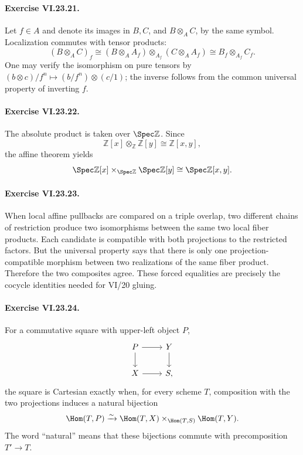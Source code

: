 \paragraph{Exercise VI.23.21.}
\begin{solution}
Let $f\in A$ and denote its images in $B,C$, and $B\otimes_AC$, by the same symbol.  Localization
commutes with tensor products:
\[
(B\otimes_AC)_f
\cong (B\otimes_AA_f)\otimes_{A_f}(C\otimes_AA_f)
\cong B_f\otimes_{A_f}C_f.
\]
One may verify the isomorphism on pure tensors by
$(b\otimes c)/f^n\mapsto (b/f^n)\otimes(c/1)$; the inverse follows from the common universal
property of inverting $f$.
\end{solution}

\paragraph{Exercise VI.23.22.}
\begin{solution}
The absolute product is taken over $\Spec\mathbb Z$.  Since
\[
\mathbb Z[x]\otimes_{\mathbb Z}\mathbb Z[y]
\cong\mathbb Z[x,y],
\]
the affine theorem yields
\[
\Spec\mathbb Z[x]\times_{\Spec\mathbb Z}\Spec\mathbb Z[y]
\cong\Spec\mathbb Z[x,y].
\]
\end{solution}

\paragraph{Exercise VI.23.23.}
\begin{solution}
When local affine pullbacks are compared on a triple overlap, two different chains of restriction
produce two isomorphisms between the same two local fiber products.  Each candidate is compatible
with both projections to the restricted factors.  But the universal property says that there is
only one projection-compatible morphism between two realizations of the same fiber product.
Therefore the two composites agree.  These forced equalities are precisely the cocycle identities
needed for VI/20 gluing.
\end{solution}

\paragraph{Exercise VI.23.24.}
\begin{solution}
For a commutative square with upper-left object $P$,
\[
\begin{tikzcd}
P\arrow[r]\arrow[d]&Y\arrow[d]\\
X\arrow[r]&S,
\end{tikzcd}
\]
the square is Cartesian exactly when, for every scheme $T$, composition with the two projections
induces a natural bijection
\[
\Hom(T,P)\xrightarrow{\sim}
\Hom(T,X)\times_{\Hom(T,S)}\Hom(T,Y).
\]
The word ``natural'' means that these bijections commute with precomposition $T'\to T$.
\end{solution}

